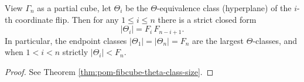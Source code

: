 \begin{conclusion}\label{con:xi-terminal-fibcube-hyperplane-theta-stats}
View \(\Gamma_n\) as a partial cube, let \(\Theta_i\) be the \(\Theta\)-equivalence class (hyperplane) of the \(i\)-th coordinate flip.
Then for any \(1\le i\le n\) there is a strict closed form
\[
|\Theta_i|=F_i\,F_{n-i+1}.
\]
In particular, the endpoint classes \(|\Theta_1|=|\Theta_n|=F_n\) are the largest \(\Theta\)-classes, and when \(1<i<n\) strictly \(|\Theta_i|<F_n\).
\end{conclusion}
\begin{proof}[Proof]
See Theorem \ref{thm:pom-fibcube-theta-class-size}.
\end{proof}

